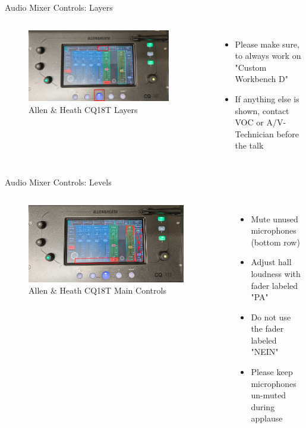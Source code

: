 
\begin{frame}{Audio Mixer Controls: Layers}
	\begin{columns}[T,onlytextwidth]
		\begin{figure} 
			\centering
			\includegraphics[width=0.9\textwidth]{images/allenheath-layers.jpg}
			\caption{Allen \& Heath CQ18T Layers}
		\end{figure}
		\begin{itemize}
			\item Please make sure, to always work on "Custom Workbench D"
			\item If anything else is shown, contact VOC or A/V-Technician before the talk
		\end{itemize}
	\end{columns}
\end{frame}

\begin{frame}{Audio Mixer Controls: Levels}
	\begin{columns}[T,onlytextwidth]
		\begin{figure} 
			\centering
			\includegraphics[width=0.9\textwidth]{images/allenheath-main-controls.jpg}
			\caption{Allen \& Heath CQ18T Main Controls}
		\end{figure}
		\begin{itemize}
			\item Mute unused microphones (bottom row)
			\item Adjust hall loudness with fader labeled "PA"
			\item Do not use the fader labeled "NEIN"
			\item Please keep microphones un-muted during applause
		\end{itemize}
	\end{columns}
\end{frame}
